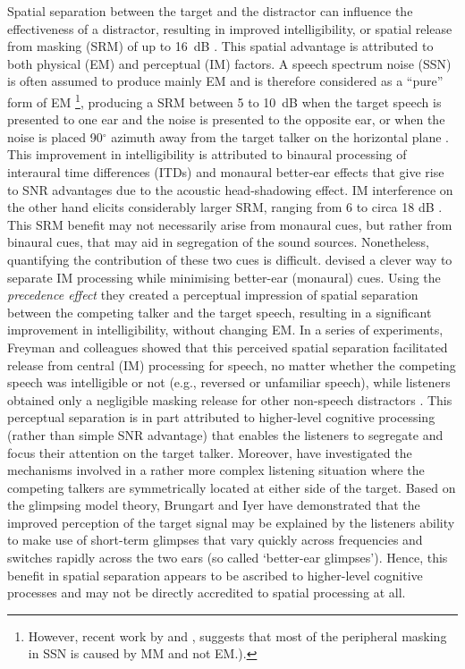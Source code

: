 \documentclass[a4paper, twoside]{templates/ociamthesis}
\begin{document}
Spatial separation between the target and the distractor can influence the effectiveness of a distractor, resulting in improved intelligibility, or spatial release from masking (SRM) of up to 16~dB \autocite{Freyman1999}. This spatial advantage is attributed to both physical (EM) and perceptual (IM) factors. A speech spectrum noise (SSN) is often assumed to produce mainly EM and is therefore considered as a ``pure'' form of EM \autocite{Brungart2001}\footnote{However, recent work by \textcite{Stone2012} and \textcite{Stone2014}, suggests that most of the peripheral masking in SSN is caused by MM and not EM.).}, producing a SRM between 5 to 10~dB when the target speech is presented to one ear and the noise is presented to the opposite ear, or when the noise is placed 90\(^{\circ}\) azimuth away from the target talker on the horizontal plane \autocite[see][]{Best2011}. This improvement in intelligibility is attributed to binaural processing of interaural time differences (ITDs) and monaural better-ear effects that give rise to SNR advantages due to the acoustic head-shadowing effect. IM interference on the other hand elicits considerably larger SRM, ranging from 6 to circa 18 dB \autocite[cf.][]{Best2011}. This SRM benefit may not necessarily arise from monaural cues, but rather from binaural cues, that may aid in segregation of the sound sources. Nonetheless, quantifying the contribution of these two cues is difficult. \textcite{Freyman1999} devised a clever way to separate IM processing while minimising better-ear (monaural) cues. Using the \textit{precedence effect} \autocite[i.e., the use of early reflections for sound source localisation;][]{Hirsh1950} they created a perceptual impression of spatial separation between the competing talker and the target speech, resulting in a significant improvement in intelligibility, without changing EM. In a series of experiments, Freyman and colleagues showed that this perceived spatial separation facilitated release from central (IM) processing for speech, no matter whether the competing speech was intelligible or not (e.g., reversed or unfamiliar speech), while listeners obtained only a negligible masking release for other non-speech distractors \autocites[e.g., SSN or amplitude modulated SSN;][]{Freyman1999,Freyman2001,Freyman2004}. This perceptual separation is in part attributed to higher-level cognitive processing (rather than simple SNR advantage) that enables the listeners to segregate and focus their attention on the target talker. Moreover, \textcite{Brungart2012} have investigated the mechanisms involved in a rather more complex listening situation where the competing talkers are symmetrically located at either side of the target. Based on the glimpsing model theory, Brungart and Iyer have demonstrated that the improved perception of the target signal may be explained by the listeners ability to make use of short-term glimpses that vary quickly across frequencies and switches rapidly across the two ears (so called `better-ear glimpses'). Hence, this benefit in spatial separation appears to be ascribed to higher-level cognitive processes and may not be directly accredited to spatial processing at all.\\
\end{document}
